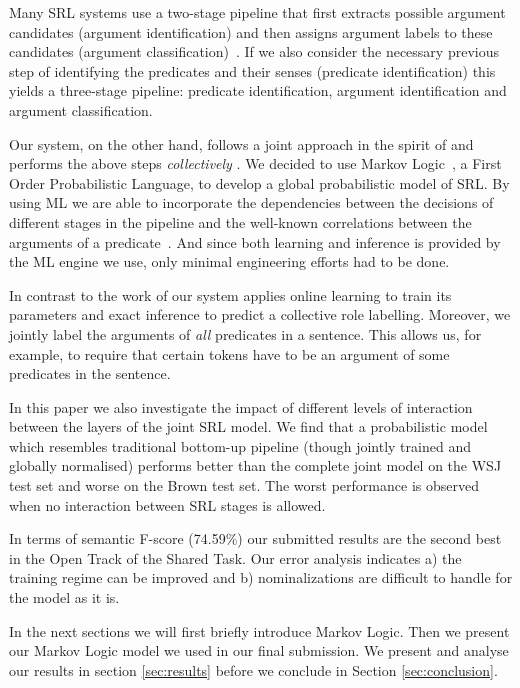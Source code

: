 
 
Many SRL systems use a two-stage pipeline that first extracts possible argument candidates (argument identification) and then assigns argument labels to these candidates (argument classification)~\citep{xue04calibrating}. If we also consider the necessary previous step of identifying the predicates and their senses (predicate identification) this yields a three-stage pipeline: predicate identification, argument identification and argument classification. 

Our system, on the other hand, follows a joint approach in the spirit of \cite{toutanova05joint} and performs the above steps \emph{collectively} . We decided to use Markov Logic~\citep[ML,][]{richardson05markov}, a First Order Probabilistic Language, to develop a global probabilistic model of SRL. By using ML we are able to incorporate the dependencies between the decisions of different stages in the pipeline and the well-known correlations between the arguments of a predicate~\citep{punyakanok05generalized}. And since both learning and inference is provided by the ML engine we use, only minimal engineering efforts had to be done.

In contrast to the work of \cite{toutanova05joint} our system applies online learning to train its parameters and exact inference to predict a collective role labelling. Moreover, we jointly label the arguments of \emph{all} predicates in a sentence. This allows us, for example, to require that certain tokens have to be an argument of some predicates in the sentence.  

In this paper we also investigate the impact of different levels of interaction between the layers of the joint SRL model. We find that a probabilistic model which resembles traditional bottom-up pipeline (though jointly trained and globally normalised) performs better than the complete joint model on the WSJ test set and worse on the Brown test set. The worst performance is observed when no interaction between SRL stages is allowed.

In terms of semantic F-score (74.59\%) our submitted results are the second best in the Open Track of the Shared Task. Our error analysis indicates a) the training regime can be improved and b) nominalizations are difficult to handle for the model as it is. 

In the next sections we will first briefly introduce Markov Logic. Then we present our Markov Logic model we used in our final submission. We present and analyse our results in section \ref{sec:results} before we conclude in Section \ref{sec:conclusion}.

